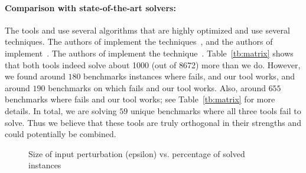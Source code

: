 \paragraph{Comparison with state-of-the-art solvers: }
The tools \alphabeta{} and \ovaltool{} use several algorithms that are highly optimized and use several techniques. 
The authors of \alphabeta{} implement the techniques~\cite{zhang2018efficient,wang2021beta,xu2020fast,zhang2022branch,tjeng2017evaluating}, 
and the authors of \ovaltool{} implement~\cite{bunel2018unified,bunel2020branch,bunel2020lagrangian,de2021scaling,de2021scaling,de2021scaling2,de2021improved}.
The authors of \marabou{} implement the technique~\cite{katz2019marabou}. 
Table~\ref{tb:matrix} shows that both tools indeed solve about 1000 (out of 8672) more than we do. 
However, we found around $180$ benchmarks instances where \alphabeta{} fails, and our tool works, 
and around $190$ benchmarks on which \ovaltool{} fails and our tool works. 
Also, around $655$ benchmarks where \marabou{} fails and our tool works; see Table~\ref{tb:matrix} for more details. 
In total, we are solving $59$ unique benchmarks where all three tools fail to solve. 
Thus we believe that these tools are truly orthogonal in their strengths and could potentially be combined. 

\begin{figure}[t]

    \caption{Size of input perturbation (epsilon) vs. percentage of solved instances}
    \label{res:ep:milp_with_milp}
\end{figure}


